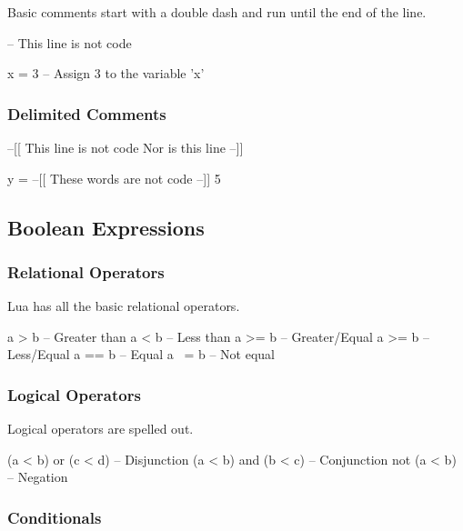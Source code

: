 \documentclass[11pt]{article}
\begin{document}
Basic comments start with a double dash and run until the end of the line.

\begin{LuaCode}
-- This line is not code
\end{LuaCode}

\begin{LuaCode}
x = 3 -- Assign 3 to the variable 'x'
\end{LuaCode}

\subsubsection{Delimited Comments}

\begin{LuaCode}
--[[
This line is not code
Nor is this line
--]]
\end{LuaCode}

\begin{LuaCode}
y = --[[ These words are not code --]] 5
\end{LuaCode}

\subsection{Boolean Expressions}

\subsubsection{Relational Operators}

Lua has all the basic relational operators.

\begin{LuaCode}
a > b  -- Greater than
a < b  -- Less than
a >= b -- Greater/Equal
a >= b -- Less/Equal
a == b -- Equal
a ~= b -- Not equal
\end{LuaCode}

\subsubsection{Logical Operators}

Logical operators are spelled out.

\begin{LuaCode}
(a < b) or (c < d)  -- Disjunction
(a < b) and (b < c) -- Conjunction
not (a < b)         -- Negation
\end{LuaCode}

\subsubsection{Conditionals}
\end{document}
